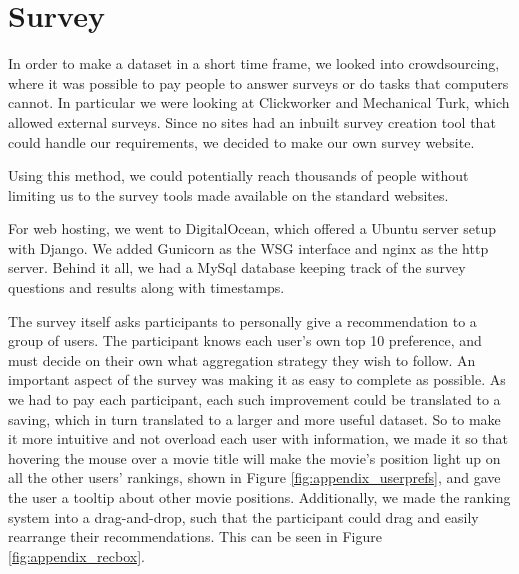\section{Survey}

In order to make a dataset in a short time frame, we looked into crowdsourcing, where it was possible to pay people to answer surveys or do tasks that computers cannot. In particular we were looking at Clickworker and Mechanical Turk, which allowed external surveys. Since no sites had an inbuilt survey creation tool that could handle our requirements, we decided to make our own survey website.

Using this method, we could potentially reach thousands of people without limiting us to the survey tools made available on the standard websites.

For web hosting, we went to DigitalOcean, which offered a Ubuntu server setup with Django. We added Gunicorn as the WSG interface and nginx as the http server. Behind it all, we had a MySql database keeping track of the survey questions and results along with timestamps.


The survey itself asks participants to personally give a recommendation to a group of users. The participant knows each user's own top 10 preference, and must decide on their own what aggregation strategy they wish to follow. An important aspect of the survey was making it as easy to complete as possible. As we had to pay each participant, each such improvement could be translated to a saving, which in turn translated to a larger and more useful dataset. So to make it more intuitive and not overload each user with information, we made it so that hovering the mouse over a movie title will make the movie's position light up on all the other users' rankings, shown in Figure \ref{fig:appendix_userprefs}, and gave the user a tooltip about other movie positions. Additionally, we made the ranking system into a drag-and-drop, such that the participant could drag and easily rearrange their recommendations. This can be seen in Figure \ref{fig:appendix_recbox}.

